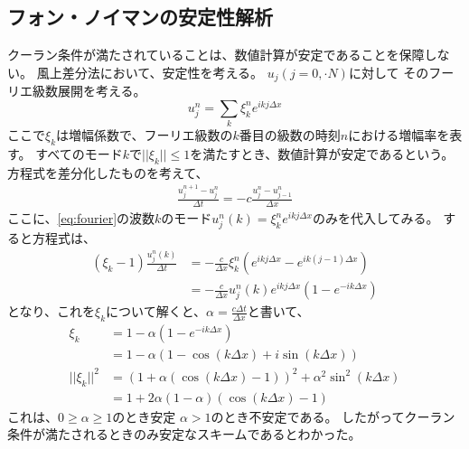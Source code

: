 \documentclass[a4j, dvipdfmx]{jsarticle}
\begin{document}
\subsection{フォン・ノイマンの安定性解析}
クーラン条件が満たされていることは、数値計算が安定であることを保障しない。
風上差分法において、安定性を考える。
$u_j(j=0,\cdot N)$に対して
そのフーリエ級数展開を考える。
\begin{equation}
    u^n_j = \sum_k \xi^n_k e^{ikj\Delta x}\label{eq:fourier}
\end{equation}
ここで$\xi_k$は増幅係数で、フーリエ級数の$k$番目の級数の時刻$n$における増幅率を表す。
すべてのモード$k$で$||\xi_k||\leq1$を満たすとき、数値計算が安定であるという。
方程式を差分化したものを考えて、
\begin{align}
    \frac{u^{n+1}_j - u^{n}_j}{\Delta t} =- c \frac{u^n_{j} - u^n_{j-1}}{\Delta x}
\end{align}
ここに、\eqref{eq:fourier}の波数$k$のモード$u^n_j(k) = \xi^n_ke^{ikj\Delta x}$のみを代入してみる。
すると方程式は、
\begin{align}
    (\xi_k -1)\frac{u^n_j(k)}{\Delta t}&=- \frac{c}{\Delta x} \xi^n_k(e^{ikj\Delta x} - e^{ik(j-1)\Delta x})\\
                                        &=- \frac{c}{\Delta x} u^n_j(k)e^{ikj\Delta x}(1 - e^{-ik\Delta x})
\end{align}
となり、これを$\xi_k$について解くと、$\alpha = \frac{c\Delta t}{\Delta x}$と書いて、
\begin{align}
    \xi_k &= 1 -  \alpha(1 - e^{-ik\Delta x})\\
          &= 1 - \alpha (1 - \cos(k\Delta x) + i\sin(k\Delta x))\\
    ||\xi_k||^2 &= (1 + \alpha(\cos(k\Delta x) -1))^2 + \alpha^2 \sin^2(k\Delta x)\\
                &= 1 + 2\alpha(1-\alpha)(\cos(k\Delta x) -1)
\end{align}
これは、$0 \geq \alpha \geq 1$のとき安定
$\alpha > 1$のとき不安定である。
したがってクーラン条件が満たされるときのみ安定なスキームであるとわかった。
\end{document}
